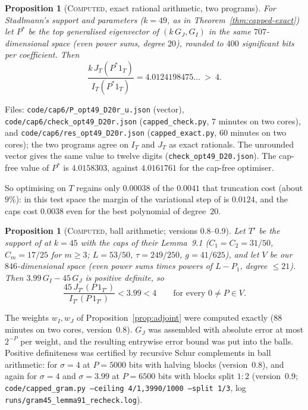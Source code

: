 \documentclass[11pt]{amsart}
\newtheorem{proposition}[theorem]{Proposition}
\theoremstyle{definition}
\theoremstyle{remark}
\newcommand{\lbl}[1]{\textup{\textsc{#1}}}
\begin{document}
\begin{proposition}[\lbl{Computed}, exact rational arithmetic, two programs]\label{prop:opt49}
For Stadlmann's support and parameters ($k=49$, as in
Theorem~\ref{thm:capped-exact}) let $P^\ast$ be the top generalised
eigenvector of $(k\,G_J,G_I)$ in the same $707$-dimensional space (even
power sums, degree $20$), rounded to $400$ significant bits per
coefficient. Then
\[
\frac{k\,J_T(P^\ast1_T)}{I_T(P^\ast1_T)}=4.0124198475\ldots\ >\ 4 .
\]
\end{proposition}
\begin{sloppypar}
Files: \texttt{code/cap6/P\_opt49\_D20r\_u.json} (vector),
\texttt{code/cap6/check\_opt49\_D20r.json} (\texttt{capped\_check.py}, $7$
minutes on two cores), and \texttt{code/cap6/res\_opt49\_D20r.json} (\texttt{capped\_exact.py}, $60$ minutes on two cores); the two programs agree on $I_T$ and $J_T$ as exact rationals. The unrounded vector gives the same value to
twelve digits (\texttt{check\_opt49\_D20.json}). The cap-free value of
$P^\ast$ is $4.0158303$, against $4.0161761$ for the cap-free optimiser.
\end{sloppypar}
So optimising on $T$ regains only $0.00038$ of the $0.0041$ that truncation
cost (about $9\%$): in this test space the margin of the variational step of
\cite{Sta26} is $0.0124$, and the caps cost $0.0038$ even for the best
polynomial of degree~$20$.

\begin{proposition}[\lbl{Computed}, ball arithmetic; versions 0.8--0.9]\label{prop:cha-ceiling}
Let $T'$ be the support of \cite{Cha26} at $k=45$ with the caps of their
Lemma~9.1 ($C_1=C_2=31/50$, $C_m=17/25$ for $m\ge3$; $L=53/50$,
$\tau=249/250$, $g=41/625$), and let $V$ be our $846$-dimensional space
(even power sums times powers of $L-P_1$, degree $\le21$). Then
$3.99\,G_I-45\,G_J$ is positive definite, so
\[
\frac{45\,J_{T'}(P\,1_{T'})}{I_{T'}(P\,1_{T'})}<3.99<4\qquad\text{for every }0\ne P\in V .
\]
\end{proposition}
\begin{sloppypar}
The weights $w_I,w_J$ of Proposition~\ref{prop:adjoint} were computed exactly
($88$ minutes on two cores, version~0.8). $G_J$ was assembled with absolute
error at most $2^{-P}$ per weight, and the resulting entrywise error bound was
put into the balls. Positive definiteness was certified by recursive Schur
complements in ball arithmetic: for $\sigma=4$ at $P=5000$ bits with halving
blocks (version~0.8), and again for $\sigma=4$ and $\sigma=3.99$ at
$P=6500$ bits with blocks split $1:2$ (version~0.9;
\texttt{code/capped\_gram.py --ceiling 4/1,3990/1000 --split 1/3}, log
\texttt{runs/gram45\_lemma91\_recheck.log}).
\end{sloppypar}
\end{document}
